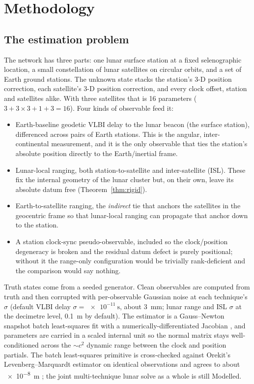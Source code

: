 \section{Methodology}

\subsection{The estimation problem}

The network has three parts: one lunar surface station at a fixed selenographic
location, a small constellation of lunar satellites on circular orbits, and a
set of Earth ground stations. The unknown state stacks the station's 3-D position
correction, each satellite's 3-D position correction, and every clock offset,
station and satellites alike. With three satellites that is 16 parameters
($3 + 3\times3 + 1 + 3 = 16$). Four kinds of observable feed it:

\begin{itemize}
  \item Earth-baseline geodetic VLBI delay to the lunar beacon (the surface
    station), differenced across pairs of Earth stations. This is the angular,
    inter-continental measurement, and it is the only observable that ties the
    station's absolute position directly to the Earth/inertial frame.
  \item Lunar-local ranging, both station-to-satellite and inter-satellite
    (ISL). These fix the internal geometry of the lunar cluster but, on their
    own, leave its absolute datum free (Theorem~\ref{thm:rigid}).
  \item Earth-to-satellite ranging, the \emph{indirect} tie that anchors the
    satellites in the geocentric frame so that lunar-local ranging can propagate
    that anchor down to the station.
  \item A station clock-sync pseudo-observable, included so the clock/position
    degeneracy is broken and the residual datum defect is purely positional;
    without it the range-only configuration would be trivially rank-deficient and
    the comparison would say nothing.
\end{itemize}

Truth states come from a seeded generator. Clean observables are computed from
truth and then corrupted with per-observable Gaussian noise at each technique's
$\sigma$ (default VLBI delay $\sigma = \SI{e-11}{\second}$, about \SI{3}{\milli\meter};
lunar range and ISL $\sigma$ at the decimetre level, \SI{0.1}{\meter} by default).
The estimator is a Gauss--Newton snapshot batch least-squares fit with a
numerically-differentiated Jacobian \citep{montenbruck2000}, and parameters are
carried in a scaled internal unit so the normal matrix stays well-conditioned
across the ${\sim}c^2$ dynamic range between the clock and position partials. The
batch least-squares primitive is cross-checked against Orekit's
Levenberg--Marquardt estimator on identical observations and agrees to about
\SI{e-8}{\meter} \citep{orekit}; the joint multi-technique lunar solve as a whole
is still Modelled.

